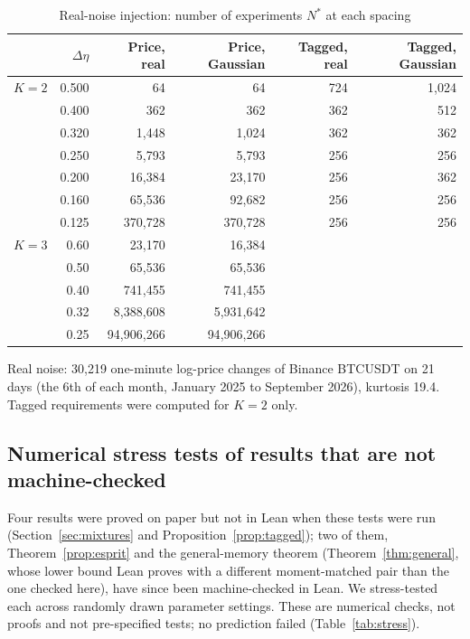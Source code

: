 \documentclass[12pt]{article}
\theoremstyle{definition}
\theoremstyle{remark}
\begin{document}
\begin{table}[!htbp]\centering\small
\begin{threeparttable}
\caption{Real-noise injection: number of experiments $N^*$ at each spacing}\label{tab:injectionfull}
\begin{tabular}{lrrrrr}
\toprule
 & $\Delta\eta$ & Price, real & Price, Gaussian & Tagged, real & Tagged, Gaussian\\
\midrule
$K=2$ & 0.500 & 64 & 64 & 724 & 1{,}024\\
 & 0.400 & 362 & 362 & 362 & 512\\
 & 0.320 & 1{,}448 & 1{,}024 & 362 & 362\\
 & 0.250 & 5{,}793 & 5{,}793 & 256 & 256\\
 & 0.200 & 16{,}384 & 23{,}170 & 256 & 362\\
 & 0.160 & 65{,}536 & 92{,}682 & 256 & 256\\
 & 0.125 & 370{,}728 & 370{,}728 & 256 & 256\\
\midrule
$K=3$ & 0.60 & 23{,}170 & 16{,}384 & & \\
 & 0.50 & 65{,}536 & 65{,}536 & & \\
 & 0.40 & 741{,}455 & 741{,}455 & & \\
 & 0.32 & 8{,}388{,}608 & 5{,}931{,}642 & & \\
 & 0.25 & 94{,}906{,}266 & 94{,}906{,}266 & & \\
\bottomrule
\end{tabular}
\begin{tablenotes}\footnotesize\item Real noise: 30{,}219 one-minute log-price changes of Binance BTCUSDT on 21 days (the 6th of each month, January 2025 to September 2026), kurtosis 19.4. Tagged requirements were computed for $K=2$ only.\end{tablenotes}
\end{threeparttable}
\end{table}

\subsection{Numerical stress tests of results that are not machine-checked}\label{app:stress}

Four results were proved on paper but not in Lean when these tests were run (Section~\ref{sec:mixtures} and Proposition~\ref{prop:tagged}); two of them, Theorem~\ref{prop:esprit} and the general-memory theorem (Theorem~\ref{thm:general}, whose lower bound Lean proves with a different moment-matched pair than the one checked here), have since been machine-checked in Lean. We stress-tested each across randomly drawn parameter settings. These are numerical checks, not proofs and not pre-specified tests; no prediction failed (Table~\ref{tab:stress}).
\end{document}
